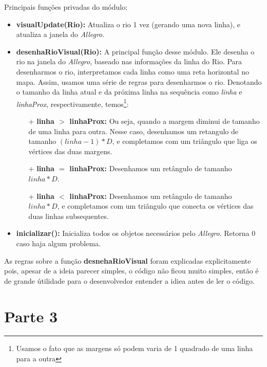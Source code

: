 \documentclass[11pt]{article}
\begin{document}
Principais funções privadas do módulo:
\begin{itemize}

\item \textbf{visualUpdate({\color{red}Rio}):} Atualiza o rio 1 vez (gerando uma nova linha), e atualiza a janela do \emph{Allegro}.

\item \textbf{desenhaRioVisual({\color{red}Rio}):} A principal função desse módulo. Ele desenha o rio na janela do \emph{Allegro}, baseado nas informações da linha do Rio. Para desenharmos o rio, interpretamos cada linha como uma reta horizontal no mapa.
Assim, usamos uma série de regras para desenharmos o rio. Denotando o tamanho da linha atual e da próxima linha na sequência como \emph{linha} e \emph{linhaProx}, respectivamente, temos\footnote{Usamos o fato que as margens só podem varia de 1 quadrado de uma linha para a outra}:
	\begin{itemize}
	
	\item[+] \textbf{linha $>$ linhaProx:} Ou seja, quando a margem 	diminui de tamanho de uma linha para outra. Nesse caso, desenhamos um retangulo de tamanho $(linha-1)*D$, e completamos com um triângulo que liga os vértices das duas margens.
	
	\item[+] \textbf{linha $=$ linhaProx:} Desenhamos um retângulo de tamanho $linha*D$.
	
	\item[+] \textbf{linha $<$ linhaProx:} Desenhamos um retângulo de tamanho $linha*D$, e completamos com um triângulo que conecta os vértices das duas linhas subsequentes.
	
	\end{itemize}
	
\item \textbf{inicializar():} Inicializa todos os objetos necessários pelo \emph{Allegro}. Retorna 0 caso haja algum problema.


\end{itemize}

As regras sobre a função \textbf{desnehaRioVisual} foram explicadas explicitamente pois, apesar de a ideia parecer simples, o código não ficou muito simples, então é de grande útilidade para o desenvolvedor entender a idiea antes de ler o código.


\section{Parte 3}
\end{document}

